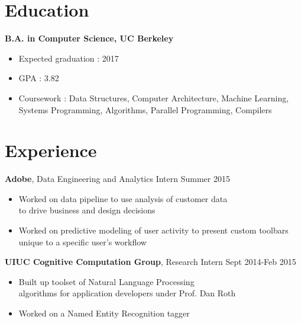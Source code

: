 \documentclass[margin]{res}
\begin{document}
 


\begin{resume} 
  

  \section{Education} 
          {\bf B.A. in Computer Science, UC Berkeley}
          \begin{itemize} \itemsep -3pt
          \item Expected graduation : 2017
	  \item GPA : 3.82
          \item Coursework : Data Structures, Computer Architecture,
              Machine Learning, \\Systems Programming, Algorithms, Parallel
              Programming, Compilers
          \end{itemize}
          

          \section{Experience}
                  {\bf Adobe}, Data Engineering and Analytics Intern \hfill Summer 2015
                  \begin{itemize} \itemsep -3pt
                  \item Worked on data pipeline to use analysis of customer data \\to drive business and design decisions
                  \item Worked on predictive modeling of user activity to present custom toolbars unique to a specific user's workflow
                  \end{itemize}
                  
                  {\bf UIUC Cognitive Computation Group}, Research Intern \hfill Sept 2014-Feb 2015
                  \begin{itemize} \itemsep -3pt
                  \item Built up toolset of Natural Language Processing \\
                    algorithms for application developers under Prof. Dan Roth
                  \item Worked on a Named Entity Recognition tagger
                  \end{itemize}
                  

\end{resume}
\end{document}
